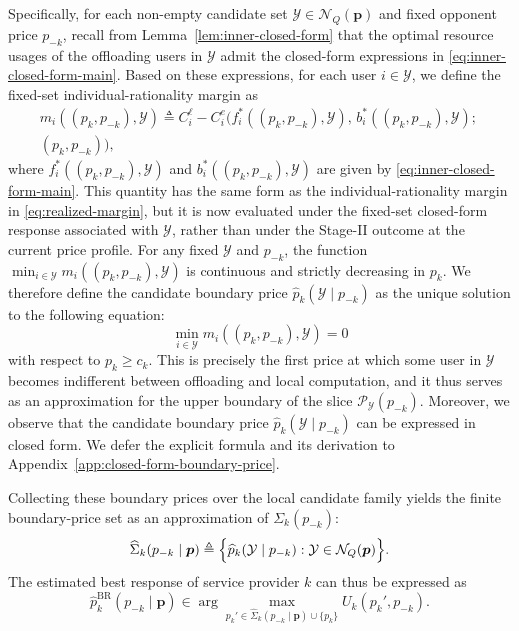 \documentclass[lettersize,journal]{IEEEtran}
\begin{document}
Specifically, for each non-empty candidate set $\mathcal Y\in\mathcal N_Q(\boldsymbol p)$ and fixed opponent price $p_{-k}$, recall from Lemma~\ref{lem:inner-closed-form} that the optimal resource usages of the offloading users in $\mathcal Y$ admit the closed-form expressions in \eqref{eq:inner-closed-form-main}. Based on these expressions, for each user $i\in\mathcal Y$, we define the fixed-set individual-rationality margin as
\begin{equation}\label{eq:fixed-set-margin}
\begin{split}
    m_i((p_k,p_{-k}),\mathcal Y)
\triangleq
C_i^\ell-
C_i^e\!(
f_i^*((p_k,p_{-k}),\mathcal Y),\,
b_i^*((p_k,p_{-k}),\mathcal Y);\,\\
(p_k,p_{-k})
),
\end{split}
\end{equation}
where $f_i^*((p_k,p_{-k}),\mathcal Y)$ and $b_i^*((p_k,p_{-k}),\mathcal Y)$ are given by \eqref{eq:inner-closed-form-main}. This quantity has the same form as the individual-rationality margin in \eqref{eq:realized-margin}, but it is now evaluated under the fixed-set closed-form response associated with $\mathcal Y$, rather than under the Stage-II outcome at the current price profile. For any fixed $\mathcal Y$ and $p_{-k}$, the function $\min_{i\in\mathcal Y} m_i((p_k,p_{-k}),\mathcal Y)$ is continuous and strictly decreasing in $p_k$. We therefore define the candidate boundary price $\widehat p_k(\mathcal Y\mid p_{-k})$ as the unique solution to the following equation:
\begin{equation}\label{eq:candidate-boundary-price}
\min_{i\in\mathcal Y} m_i((p_k,p_{-k}),\mathcal Y)=0
\end{equation}
with respect to $p_k\ge c_k$.
This is precisely the first price at which some user in $\mathcal Y$ becomes indifferent between offloading and local computation, and it thus serves as an approximation for the upper boundary of the slice $\mathcal P_{\mathcal Y}(p_{-k})$. Moreover, we observe that the candidate boundary price $\widehat p_k(\mathcal Y\mid p_{-k})$ can be expressed in closed form. We defer the explicit formula and its derivation to Appendix~\ref{app:closed-form-boundary-price}.

Collecting these boundary prices over the local candidate family yields the finite boundary-price set as an approximation of $\Sigma_k(p_{-k})$:
\begin{equation}\label{eq:best-response-candidate-set}
\widehat{\Sigma}_k(p_{-k}\mid\boldsymbol p)
\triangleq
\Bigl\{
\widehat p_k(\mathcal Y\mid p_{-k}):
\mathcal Y\in\mathcal N_Q(\boldsymbol p)
\Bigr\}.
\end{equation}
The estimated best response of service provider $k$ can thus be expressed as
\begin{equation}\label{eq:one-shot-br-estimator}
\widehat{p}_k^{\mathrm{BR}}(p_{-k}\mid\boldsymbol p)
\in
\arg\max_{p_k'\in \widehat{\Sigma}_k(p_{-k}\mid\boldsymbol p)\cup\{p_k\}}
U_k(p_k',p_{-k}).
\end{equation}
\end{document}
